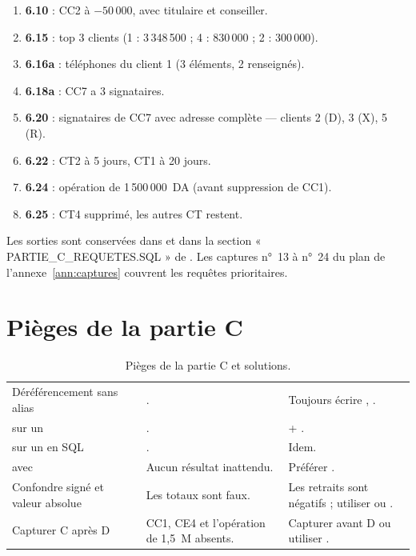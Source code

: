 \begin{enumerate}
  \item \textbf{6.10} : CC2 à $-50\,000$, avec titulaire et conseiller.
  \item \textbf{6.15} : top 3 clients (1 : 3\,348\,500 ; 4 : 830\,000 ;
        2 : 300\,000).
  \item \textbf{6.16a} : téléphones du client 1 (3 éléments, 2 renseignés).
  \item \textbf{6.18a} : CC7 a 3 signataires.
  \item \textbf{6.20} : signataires de CC7 avec adresse complète — clients 2
        (D), 3 (X), 5 (R).
  \item \textbf{6.22} : CT2 à 5 jours, CT1 à 20 jours.
  \item \textbf{6.24} : opération de 1\,500\,000~DA (avant suppression de CC1).
  \item \textbf{6.25} : CT4 supprimé, les autres CT restent.
\end{enumerate}

\begin{remarquebox}
Les sorties sont conservées dans  et dans la section
« PARTIE\_C\_REQUETES.SQL » de . Les captures n°~13
à n°~24 du plan de l'annexe~\ref{ann:captures} couvrent les requêtes
prioritaires.
\end{remarquebox}

\section{Pièges de la partie C}

\begin{table}[htbp]
  \centering
  \small
  \caption{Pièges de la partie C et solutions.}
  \label{tab:pieges-partieC}
  \begin{tabularx}{\textwidth}{@{}L{5.0cm}L{4.8cm}X@{}}
    \toprule
     &  &  \\
    \midrule
    Déréférencement sans alias & . &
    Toujours écrire , . \\
     sur un  & . &
     + . \\
     sur un  en SQL & . & Idem. \\
     avec  & Aucun résultat inattendu. &
    Préférer . \\
    Confondre  signé et valeur absolue & Les totaux sont faux. &
    Les retraits sont négatifs ; utiliser  ou . \\
    Capturer C après D & CC1, CE4 et l'opération de 1,5~M absents. &
    Capturer avant D ou utiliser . \\
    \bottomrule
  \end{tabularx}
\end{table}

